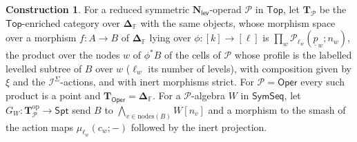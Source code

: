 \documentclass[11pt]{amsart}
\theoremstyle{definition}
\newtheorem{construction}[subsection]{Construction}
\theoremstyle{remark}
\newcommand{\Spt}{\mathsf{Spt}}
\newcommand{\SymSeq}{\mathsf{SymSeq}}
\newcommand{\Oper}{\mathsf{Oper}}
\newcommand{\Nl}{\mathbf{N}_{\mathsf{lev}}}
\newcommand{\Fin}{\mathbb{F}}
\newcommand{\TT}{\mathbf{T}}
\newcommand{\DFF}{\mathbf{\Delta}_{\Fin}}
\begin{document}
\begin{construction}
For a reduced symmetric $\Nl$-operad $\mathcal P$ in $\mathsf{Top}$, let $\TT_{\mathcal P}$ be the $\mathsf{Top}$-enriched category over $\DFF$ with the same objects, whose morphism space over a morphism $f\colon A\to B$ of $\DFF$ lying over $\phi\colon[k]\to[\ell]$ is $\prod_{w}\mathcal P_{\ell_w}(\underline p_w;n_w)$, the product over the nodes $w$ of $\phi^*B$ of the cells of $\mathcal P$ whose profile is the labelled levelled subtree of $B$ over $w$ ($\ell_w$ its number of levels), with composition given by $\xi$ and the $\mathcal I^\Sigma$-actions, and with inert morphisms strict. For $\mathcal P=\Oper$ every such product is a point and $\TT_{\Oper}=\DFF$. For a $\mathcal P$-algebra $W$ in $\SymSeq$, let $G_W\colon\TT_{\mathcal P}^{\mathrm{op}}\to\Spt$ send $B$ to $\bigwedge_{v\in\mathrm{nodes}(B)}W[n_v]$ and a morphism to the smash of the action maps $\mu_{\ell_w}(c_w;-)$ followed by the inert projection.
\end{construction}
\end{document}

